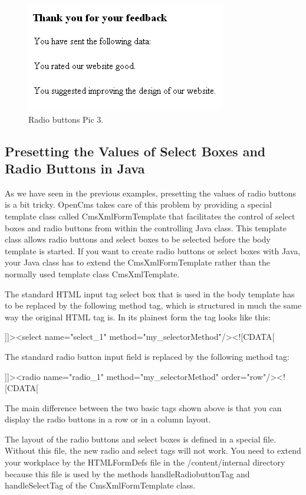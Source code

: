 \begin{figure}
\begin{center}
\includegraphics[clip,width=0.6\linewidth]{pics/modules/46}
\end{center}
\caption[Radio buttons Pic 3]{Radio buttons Pic 3.}
\label{Feedback3}
\end{figure}

\subsection {Presetting the Values of Select Boxes and Radio Buttons in Java}
As we have seen in the previous examples, presetting the values of radio
buttons is a bit tricky. OpenCms takes care of this problem by providing
a special template class called CmsXmlFormTemplate that facilitates the
control of select boxes and radio buttons from within the controlling
Java class. This template class allows radio buttons and select boxes to
be selected before the body template is started. If you want to create
radio buttons or select boxes with Java, your Java class has to extend
the CmsXmlFormTemplate rather than the normally used template class
CmsXmlTemplate.

The standard HTML input tag select box that is used in the body template
has to be replaced by the following method tag, which is structured in
much the same way the original HTML tag is. In its plainest form the tag
looks like this:

{\code ]]><select name="select\_1" method="my\_selectorMethod"/><![CDATA[}

The standard radio button input field is replaced by the following
method tag:

{\code ]]><radio name="radio\_1" method="my\_selectorMethod" order="row"/><![CDATA[}

The main difference between the two basic tags shown above is that you
can display the radio buttons in a row or in a column layout.

The layout of the radio buttons and select boxes is defined in a special
file. Without this file, the new radio and select tags will not work.
You need to extend your workplace by the HTMLFormDefs file in the
/content/internal directory because this file is used by the methods
{\tag handleRadiobuttonTag} and {\tag handleSelectTag} of the {\class CmsXmlFormTemplate
class.}

